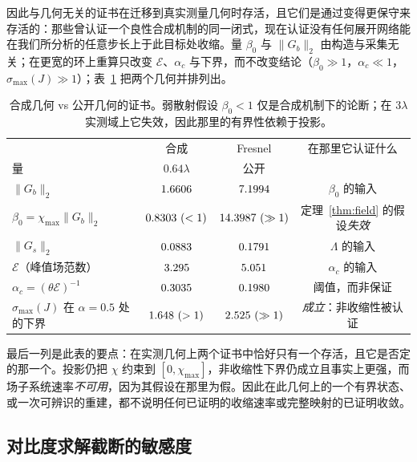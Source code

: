 \documentclass[UTF8,a4paper,11pt]{ctexart}
\newcommand{\norm}[1]{\lVert #1 \rVert}
\newcommand{\numv}[1]{#1}
\begin{document}
因此与几何无关的证书在迁移到真实测量几何时存活，且它们是通过变得更保守来存活的：那些曾认证一个良性合成机制的同一闭式，现在认证没有任何展开网络能在我们所分析的任意步长上于此目标处收缩。量 $\beta_0$ 与 $\norm{G_b}_2$ 由构造与采集无关；在更宽的环上重算只改变 $\mathcal{E}$、$\alpha_c$ 与下界，而不改变结论（$\beta_0\gg1$，$\alpha_c\ll1$，$\sigma_{\max}(J)\gg1$）；表~\ref{tab:fresnel} 把两个几何并排列出。

\begin{table}[htbp]
\centering
\caption{合成几何 vs 公开几何的证书。弱散射假设 $\beta_0<1$ 仅是合成机制下的论断；在 $3\lambda$ 实测域上它失效，因此那里的有界性依赖于投影。}
\label{tab:fresnel}
\small
\begin{tabular}{@{}lccc@{}}
\toprule
 & 合成 & Fresnel & 在那里它认证什么 \\
量 & $0.64\lambda$ & 公开 & \\
\midrule
$\norm{G_b}_2$ & $\numv{\NumGridGbLo}$ & $\numv{\NumFresnelGb}$ & $\beta_0$ 的输入 \\
$\beta_0=\chi_{\max}\norm{G_b}_2$ & $\betacert\ (<1)$ & $\numv{\NumFresnelBeta}\ (\gg1)$ &
定理~\ref{thm:field} 的假设\emph{失效} \\
$\norm{G_s}_2$ & $\numv{\NumGridGsLo}$ & $\numv{\NumFresnelPubGs}$ & $\Lambda$ 的输入 \\
$\mathcal{E}$（峰值场范数） & $\numv{\NumGridELo}$ & $\numv{\NumFresnelPubEpeak}$ &
$\alpha_c$ 的输入 \\
$\alpha_c=(\theta\mathcal{E})^{-1}$ & $\numv{\NumGridAlphaCLo}$ & $\numv{\NumFresnelPubAlphaC}$ &
阈值，而非保证 \\
$\sigma_{\max}(J)$ 在 $\alpha=0.5$ 处的下界 & $\numv{\NumFresnelSigmaLBSynth}\ (>1)$ & $\numv{\NumFresnelPubSigmaLB}\ (\gg1)$ &
\emph{成立}：非收缩性被认证 \\
\bottomrule
\end{tabular}
\end{table}
最后一列是此表的要点：在实测几何上两个证书中恰好只有一个存活，且它是否定的那一个。投影仍把 $\chi$ 约束到 $[0,\chi_{\max}]$，非收缩性下界仍成立且事实上更强，而场子系统速率\emph{不可用}，因为其假设在那里为假。因此在此几何上的一个有界状态、或一次可辨识的重建，都不说明任何已证明的收缩速率或完整映射的已证明收敛。

\subsection{对比度求解截断的敏感度}
\end{document}
